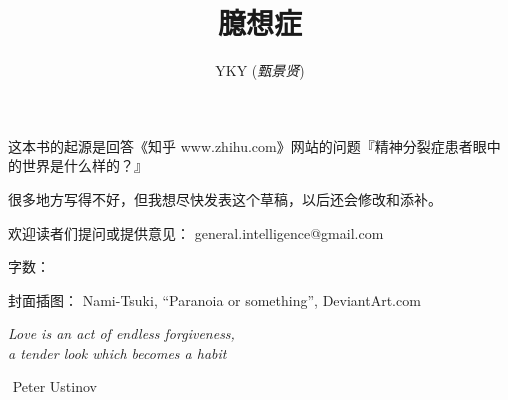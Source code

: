 \documentclass[12pt]{report}
\newcommand{\tab}{\hspace*{1cm}}
\newcommand*\dashh{\textemdash\,\,}
\begin{document}

\cleardoublepage
\title{\Huge{臆想症}}
\author{YKY (\textit{甄景贤})}



\FPsub\resulta{\thedatezero}{\thedateone}
\FPdiv{}
\FPround{}

\FPsub\resultc{\thedatezero}{\thedatetwo}
\FPdiv{}
\FPround{}

\large

{\let\newpage\relax\maketitle}

\maketitle
\setlength{\parindent}{0em}
\setlength{\parskip}{2.8ex}

\small

\begin{framed}
这本书的起源是回答《知乎 www.zhihu.com》网站的问题『精神分裂症患者眼中的世界是什么样的？』

很多地方写得不好，但我想尽快发表这个草稿，以后还会修改和添补。

欢迎读者们提问或提供意见： general.intelligence@gmail.com

字数： 

封面插图：  Nami-Tsuki, ``Paranoia or something'', DeviantArt.com
\end{framed}
\large

\newpage

\tab\tab\tab \parbox{9cm}{\textit{Love is an act of endless forgiveness,\\
a tender look which becomes a habit}}
\vspace{0.5cm}
\begin{flushright}
\dashh Peter Ustinov \hspace*{3cm}
\end{flushright}

\vspace{3cm}
\end{document}
